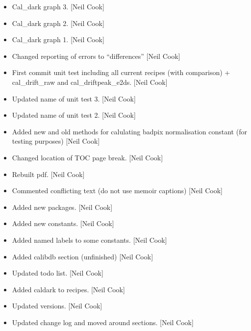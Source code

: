 \documentclass[a4paper,10pt,english]{report}
\begin{document}
\begin{itemize}
\item {} 
Cal\_dark graph 3. {[}Neil Cook{]}

\item {} 
Cal\_dark graph 2. {[}Neil Cook{]}

\item {} 
Cal\_dark graph 1. {[}Neil Cook{]}

\item {} 
Changed reporting of errors to “differences” {[}Neil Cook{]}

\item {} 
First commit unit test including all current recipes (with comparison)
+ cal\_drift\_raw and cal\_driftpeak\_e2ds. {[}Neil Cook{]}

\item {} 
Updated name of unit test 3. {[}Neil Cook{]}

\item {} 
Updated name of unit test 2. {[}Neil Cook{]}

\item {} 
Added new and old methods for calulating badpix normalisation constant
(for testing purposes) {[}Neil Cook{]}

\item {} 
Changed location of TOC page break. {[}Neil Cook{]}

\item {} 
Rebuilt pdf. {[}Neil Cook{]}

\item {} 
Commented conflicting text (do not use memoir captions) {[}Neil Cook{]}

\item {} 
Added new packages. {[}Neil Cook{]}

\item {} 
Added new constants. {[}Neil Cook{]}

\item {} 
Added named labels to some constants. {[}Neil Cook{]}

\item {} 
Added calibdb section (unfinished) {[}Neil Cook{]}

\item {} 
Updated todo list. {[}Neil Cook{]}

\item {} 
Added caldark to recipes. {[}Neil Cook{]}

\item {} 
Updated versions. {[}Neil Cook{]}

\item {} 
Updated change log and moved around sections. {[}Neil Cook{]}


\end{itemize}
\end{document}
